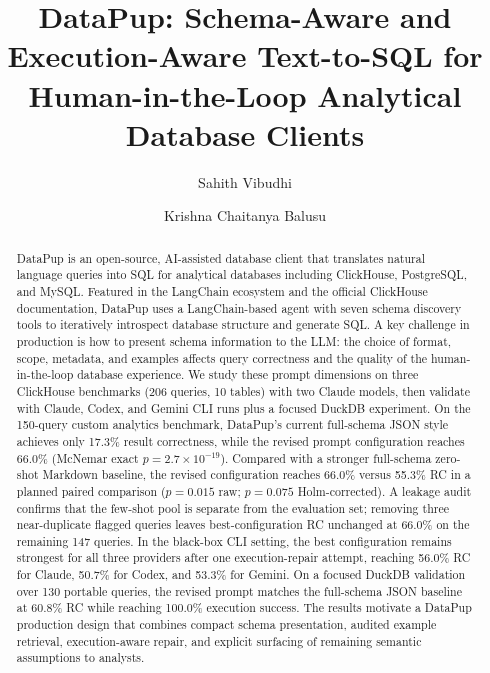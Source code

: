 \documentclass[sigconf, nonacm]{acmart}
\begin{document}
\title{DataPup: Schema-Aware and Execution-Aware Text-to-SQL for Human-in-the-Loop Analytical Database Clients}

\author{Sahith Vibudhi}

\author{Krishna Chaitanya Balusu}

\begin{abstract}
DataPup is an open-source, AI-assisted database client that translates natural language queries into SQL for analytical databases including ClickHouse, PostgreSQL, and MySQL. Featured in the LangChain ecosystem and the official ClickHouse documentation, DataPup uses a LangChain-based agent with seven schema discovery tools to iteratively introspect database structure and generate SQL. A key challenge in production is how to present schema information to the LLM: the choice of format, scope, metadata, and examples affects query correctness and the quality of the human-in-the-loop database experience. We study these prompt dimensions on three ClickHouse benchmarks (206 queries, 10 tables) with two Claude models, then validate with Claude, Codex, and Gemini CLI runs plus a focused DuckDB experiment. On the 150-query custom analytics benchmark, DataPup's current full-schema JSON style achieves only 17.3\% result correctness, while the revised prompt configuration reaches 66.0\% (McNemar exact $p{=}2.7{\times}10^{-19}$). Compared with a stronger full-schema zero-shot Markdown baseline, the revised configuration reaches 66.0\% versus 55.3\% RC in a planned paired comparison ($p{=}0.015$ raw; $p{=}0.075$ Holm-corrected). A leakage audit confirms that the few-shot pool is separate from the evaluation set; removing three near-duplicate flagged queries leaves best-configuration RC unchanged at 66.0\% on the remaining 147 queries. In the black-box CLI setting, the best configuration remains strongest for all three providers after one execution-repair attempt, reaching 56.0\% RC for Claude, 50.7\% for Codex, and 53.3\% for Gemini. On a focused DuckDB validation over 130 portable queries, the revised prompt matches the full-schema JSON baseline at 60.8\% RC while reaching 100.0\% execution success. The results motivate a DataPup production design that combines compact schema presentation, audited example retrieval, execution-aware repair, and explicit surfacing of remaining semantic assumptions to analysts.
\end{abstract}
\end{document}
